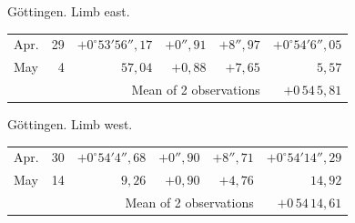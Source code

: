 \noindent\begin{minipage}[t]{.495\textwidth}\centering Göttingen. Limb east.\par\smallskip
{\scriptsize\setlength{\tabcolsep}{1pt}\renewcommand{\arraystretch}{1.2}\begin{tabular}{lr|r|r|r|r|}
Apr.&29&$+0^\circ53'56''{,}17$&$+0''{,}91$&$+8''{,}97$&$+0^\circ54'6''{,}05$\\
May&4&$57{,}04$&$+0{,}88$&$+7{,}65$&$5{,}57$\\
\cline{6-6}\multicolumn{5}{r}{Mean of 2 observations}&$+0\,54\,5{,}81$
\end{tabular}}\end{minipage}\hfill\begin{minipage}[t]{.495\textwidth}\centering Göttingen. Limb west.\par\smallskip
{\scriptsize\setlength{\tabcolsep}{1pt}\renewcommand{\arraystretch}{1.2}\begin{tabular}{lr|r|r|r|r}
Apr.&30&$+0^\circ54'4''{,}68$&$+0''{,}90$&$+8''{,}71$&$+0^\circ54'14''{,}29$\\
May&14&$9{,}26$&$+0{,}90$&$+4{,}76$&$14{,}92$\\
\cline{6-6}\multicolumn{5}{r}{Mean of 2 observations}&$+0\,54\,14{,}61$
\end{tabular}}\end{minipage}
\par\vspace{4mm}

